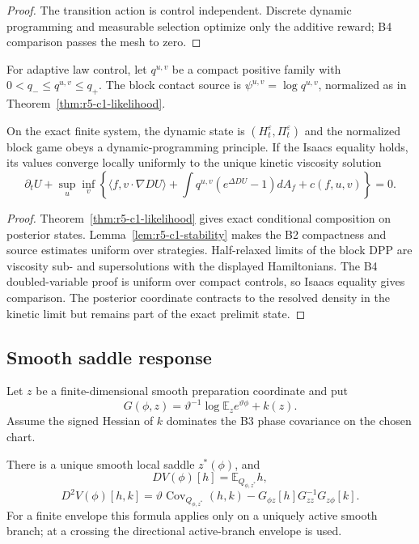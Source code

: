 \begin{proof}
The transition action is control independent.  Discrete dynamic programming
and measurable selection optimize only the additive reward; B4 comparison
passes the mesh to zero.
\end{proof}

For adaptive law control, let
\(q^{u,v}\) be a compact positive family with
\(0<q_-\le q^{u,v}\le q_+\).  The block contact source is
\(\psi^{u,v}=\log q^{u,v}\), normalized as in
Theorem~\ref{thm:r5-c1-likelihood}.

\begin{theorem}
\label{thm:r5-c1-adaptive}
On the exact finite system, the dynamic state is
\((H_t^\varepsilon,\Pi_t^\varepsilon)\) and the normalized block game obeys a
dynamic-programming principle.  If the Isaacs equality holds, its values
converge locally uniformly to the unique kinetic viscosity solution
\[
 \partial_tU+\sup_u\inf_v
 \left\{
  \langle f,v\cdot\nabla DU\rangle+
  \int q^{u,v}(e^{\Delta DU}-1)dA_f+c(f,u,v)
 \right\}=0.
\]
\end{theorem}

\begin{proof}
Theorem~\ref{thm:r5-c1-likelihood} gives exact conditional composition on
posterior states.  Lemma~\ref{lem:r5-c1-stability} makes the B2 compactness and
source estimates uniform over strategies.  Half-relaxed limits of the block
DPP are viscosity sub- and supersolutions with the displayed Hamiltonians.
The B4 doubled-variable proof is uniform over compact controls, so Isaacs
equality gives comparison.  The posterior coordinate contracts to the
resolved density in the kinetic limit but remains part of the exact prelimit
state.
\end{proof}

\subsection{Smooth saddle response}

Let \(z\) be a finite-dimensional smooth preparation coordinate and put
\[
 G(\phi,z)=\vartheta^{-1}
 \log\mathbb E_z e^{\vartheta\phi}+k(z).
\]
Assume the signed Hessian of \(k\) dominates the B3 phase covariance on the
chosen chart.

\begin{theorem}
\label{thm:r5-c1-schur}
There is a unique smooth local saddle \(z^*(\phi)\), and
\[
 DV(\phi)[h]=\mathbb E_{Q_{\phi,z^*}}h,
\]
\[
 D^2V(\phi)[h,k]=
 \vartheta\operatorname{Cov}_{Q_{\phi,z^*}}(h,k)
 -G_{\phi z}[h]G_{zz}^{-1}G_{z\phi}[k].
\]
For a finite envelope this formula applies only on a uniquely active smooth
branch; at a crossing the directional active-branch envelope is used.
\end{theorem}

